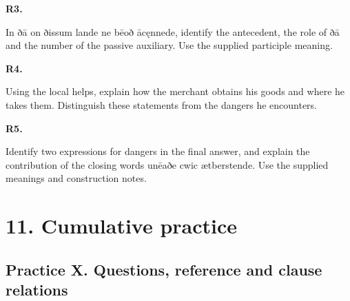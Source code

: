 \par\begin{minipage}{\linewidth}\raggedright
\textbf{R3.}

In ðā on ðissum lande ne bēoð ācęnnede, identify the antecedent, the role of ðā and the number of the passive auxiliary. Use the supplied participle meaning.

\end{minipage}\par\addvspace{4pt}

\par\begin{minipage}{\linewidth}\raggedright
\textbf{R4.}

Using the local helps, explain how the merchant obtains his goods and where he takes them. Distinguish these statements from the dangers he encounters.

\end{minipage}\par\addvspace{4pt}

\par\begin{minipage}{\linewidth}\raggedright
\textbf{R5.}

Identify two expressions for dangers in the final answer, and explain the contribution of the closing words unēaðe cwic ætberstende. Use the supplied meanings and construction notes.

\end{minipage}\par\addvspace{4pt}

\section*{11. Cumulative practice}

\subsection*{Practice X. Questions, reference and clause relations}

